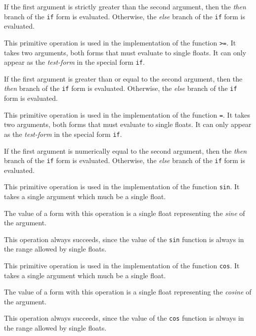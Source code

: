 If the first argument is strictly greater than the second argument,
then the \emph{then} branch of the \texttt{if} form is evaluated.
Otherwise, the \emph{else} branch of the \texttt{if} form is
evaluated.

 {}

This primitive operation is used in the implementation of the
\commonlisp{} function \texttt{>=}.  It takes two arguments, both forms
that must evaluate to single floats.  It can only appear as the
\emph{test-form} in the special form \texttt{if}.

If the first argument is greater than or equal to the second argument,
then the \emph{then} branch of the \texttt{if} form is evaluated.
Otherwise, the \emph{else} branch of the \texttt{if} form is
evaluated.

 {}

This primitive operation is used in the implementation of the
\commonlisp{} function \texttt{=}.  It takes two arguments, both forms
that must evaluate to single floats.  It can only appear as the
\emph{test-form} in the special form \texttt{if}.

If the first argument is numerically equal to the second argument,
then the \emph{then} branch of the \texttt{if} form is evaluated.
Otherwise, the \emph{else} branch of the \texttt{if} form is
evaluated.

 {}

This primitive operation is used in the implementation of the
\commonlisp{} function \texttt{sin}.  It takes a single argument which
much be a single float.

The value of a form with this operation is a single float representing
the \emph{sine} of the argument.

This operation always succeeds, since the value of the \texttt{sin}
function is always in the range allowed by single floats.

 {}

This primitive operation is used in the implementation of the
\commonlisp{} function \texttt{cos}.  It takes a single argument which
much be a single float.

The value of a form with this operation is a single float representing
the \emph{cosine} of the argument.

This operation always succeeds, since the value of the \texttt{cos}
function is always in the range allowed by single floats.

